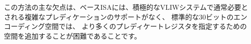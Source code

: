 \begin{comment}
The main disadvantage of this approach is that the base ISA lacks the
complex predication support usually required in an aggressive VLIW
system, and it is difficult to add space to specify more predicate
registers in the standard 30-bit encoding space.
\end{comment}
この方法の主な欠点は、ベースISAには、積極的なVLIWシステムで通常必要とされる複雑なプレディケーションのサポートがなく、
標準的な30ビットのエンコーディング空間では、
より多くのプレディケートレジスタを指定するための空間を追加することが困難であることです。
